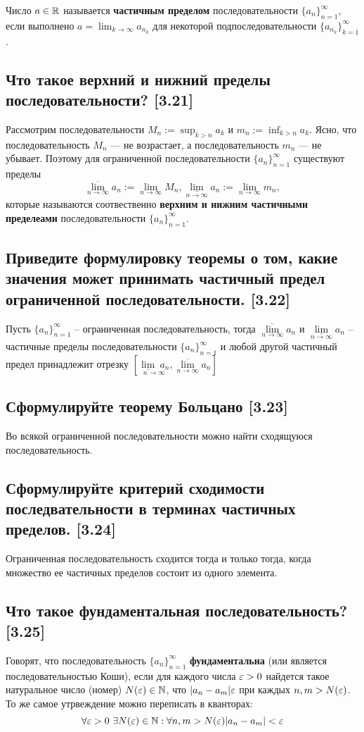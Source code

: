 \documentclass[12pt, a4paper]{article}
\begin{document}
    Число $a \in \mathbb{R}$ называется \textbf{частичным пределом} последовательности $\{a_n\}^{\infty}_{n=1}$, если выполнено $a =  \lim_{k \to \infty} a_{n_k}$ для некоторой подпоследовательности $\{a_{n_k}\}^{\infty}_{k=1}$.
    \subsection{Что такое верхний и нижний пределы последовательности? [3.21]}
    Рассмотрим последовательности $M_n :=  \sup_{k > n} a_k$ и $m_n :=  \inf_{k > n} a_k$. Ясно, что последовательность $M_n$ --- не возрастает, а последовательность $m_n$ --- не убывает. Поэтому для ограниченной последовательности $\{a_n\}^{\infty}_{n=1}$ существуют пределы
    \begin{equation*}
        \overline{\lim_{n \to \infty}} a_n := \lim_{n \to \infty} M_n, \underset{n \to \infty}{\underline{\lim}} a_n := \lim_{n \to \infty} m_n,
    \end{equation*}
    которые называются соотвественно \textbf{верхним и нижним частичными пределеами} последовательности $\{a_n\}^{\infty}_{n=1}$.
    \subsection{Приведите формулировку теоремы о том, какие значения может принимать частичный предел ограниченной последовательности. [3.22]}
    Пусть $\{a_n\}^{\infty}_{n = 1}$ -- ограниченная последовательность, тогда $\underset{n \to \infty}{\overline{\lim}} a_n$ и $\underset{n \to \infty}{\underline{\lim}} a_n$ -- частичные пределы последовательности $\{a_n\}^{\infty}_{n=1}$ и любой другой частичный предел принадлежит отрезку $\left[\underset{n \to \infty}{\underline{\lim}\ a_n}, \underset{n \to \infty}{\overline{\lim}} a_n\right]$
    \subsection{Сформулируйте теорему Больцано [3.23]}
    Во всякой ограниченной последовательности можно найти сходящуюся последовательность. 
    \subsection{Сформулируйте критерий сходимости последвательности в терминах частичных пределов. [3.24]}
    Ограниченная последовательность сходится тогда и только тогда, когда множество ее частичных пределов состоит из одного элемента.
    \subsection{Что такое фундаментальная последовательность? [3.25]}
    Говорят, что последовательность $\{a_n\}^{\infty}_{n=1}$ \textbf{фундаментальна} (или является последовательностью Коши), если для каждого числа $\varepsilon > 0$ найдется такое натуральное число (номер) $N(\varepsilon) \in \mathbb{N}$, что $|a_n - a_m| \varepsilon$ при каждых $n, m > N(\varepsilon)$. То же самое утрвеждение можно переписать в кванторах: 
    \begin{equation*}
        \forall \varepsilon > 0 \ \exists N(\varepsilon) \in \mathbb{N} : \forall n, m > N(\varepsilon) |a_n - a_m| < \varepsilon
    \end{equation*}
\end{document}
